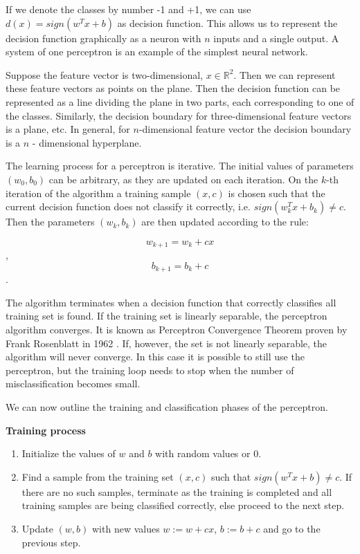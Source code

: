 \documentclass[12pt]{report}
\newcommand{\re}{\mathbb{R}}
\begin{document}
If we denote the classes by number -1 and +1, we can use $d(x) = sign(w^Tx + b)$ as decision function. This allows us to represent the decision function graphically as a neuron with $n$ inputs and a single output. A system of one perceptron is an example of the simplest neural network.

Suppose the feature vector is two-dimensional, $x \in \re^2$. Then we can represent these feature vectors as points on the plane. Then the decision function can be represented as a line dividing the plane in two parts, each corresponding to one of the classes. Similarly, the decision boundary for three-dimensional feature vectors is a plane, etc. In general, for $n$-dimensional feature vector the decision boundary is a $n$ - dimensional hyperplane.

The learning process for a perceptron is iterative. The initial values of parameters $(w_0, b_0)$ can be arbitrary, as they are updated on each iteration. On the $k$-th iteration of the algorithm a training sample $(x, c)$ is chosen such that the current decision function does not classify it correctly, i.e. $sign(w_k^Tx + b_k) \ne c$. Then the parameters $(w_k, b_k)$ are then updated according to the rule:

$$w_{k+1} = w_k + cx$$,
$$b_{k+1} = b_k + c$$.

The algorithm terminates when a decision function that correctly classifies
all training set is found. If the training set is linearly separable, the perceptron algorithm converges. It is known as Perceptron Convergence Theorem proven by Frank Rosenblatt in 1962 \cite{Cristianini}. If, however, the set is not linearly separable, the algorithm will never converge. In this case it is possible to still use the perceptron, but the training loop needs to stop when the number of misclassification becomes small.

We can now outline the training and classification phases of the perceptron.

\textbf{Training process}

\begin{enumerate}
	\item Initialize the values of $w$ and $b$ with random values or 0.
	\item Find a sample from the training set $(x, c)$ such that $sign(w^Tx + b) \ne c$. If there are no such samples, terminate as the training is completed and all training samples are being classified correctly, else proceed to the next step.
	\item Update $(w, b)$ with new values $w := w + cx$, $b := b + c$ and go to the previous step.
\end{enumerate}
\end{document}
